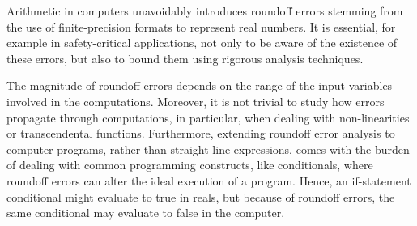 %

Arithmetic in computers unavoidably introduces roundoff errors stemming from the use of finite-precision formats to represent real numbers.
%
It is essential, for example in safety-critical applications, not only to be aware of the existence of these errors, but also to bound them using rigorous analysis techniques.
%
%

%
The magnitude of roundoff errors depends on the range of the input variables involved in the computations.
%
Moreover, it is not trivial to study how errors propagate through computations, in particular, when dealing with non-linearities or transcendental functions.
%
Furthermore, extending roundoff error analysis to computer programs, rather than straight-line expressions, comes with the burden of dealing with common programming constructs, like conditionals, where roundoff errors can alter the ideal execution of a program. 
%
Hence, an if-statement conditional might evaluate to true in reals, but because of roundoff errors, the same conditional may evaluate to false in the computer. 
%
%
%
%
%

